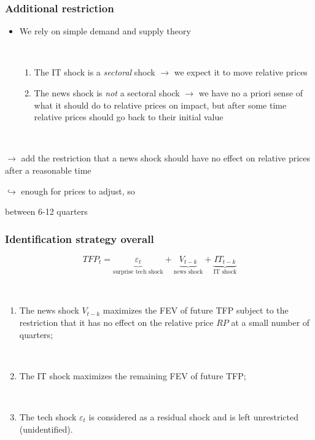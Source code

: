 \documentclass{beamer}
\begin{document}
\begin{frame}
\frametitle{Additional restriction}


\begin{itemize}
	\item We rely on simple demand and supply theory
	
	\
	
	\begin{enumerate}
		\item The IT shock is a \emph{sectoral} shock $\rightarrow$ we expect it to move relative prices
		\item The news shock is \emph{not} a sectoral shock $\rightarrow$ we have no a priori sense of what it should do to relative prices on impact, but after some time relative prices should go back to their initial value
	\end{enumerate}
	
	\
	
\end{itemize}

	$\rightarrow$ add the restriction that a news shock should have no effect on relative prices after a reasonable time
	
\hspace{4cm} $\hookrightarrow$ enough for prices to adjust, so

\hspace{4cm}   between 6-12 quarters 


\end{frame}

\begin{frame}
	\frametitle{Identification strategy overall}

\begin{equation}
TFP_t =  \underbrace{\varepsilon_t}_\text{surprise tech shock}  + \underbrace{V_{t-k}}_\text{news shock} + \underbrace{IT_{t-k}}_\text{IT shock}  
\end{equation}

\

    \begin{enumerate}
    	\item The news shock $V_{t-k}$ maximizes the FEV of future TFP subject to the restriction that it has no effect on the relative price $RP$ at a small number of quarters;
	
	\
	
    \item The IT shock maximizes the remaining FEV of future TFP;
    
    \
    
    \item The tech shock $\varepsilon_t$ is considered as a residual shock and is left unrestricted (unidentified).
   \end{enumerate}
	
	
\end{frame}
\end{document}
